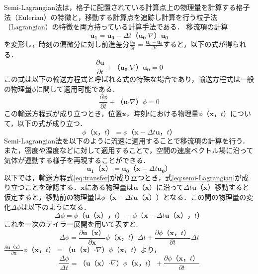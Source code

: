 \documentclass[a4j,12pt]{jreport}
\begin{document}
Semi-Lagrangian法は，格子に配置されている計算点上の物理量を計算する格子法（Eulerian）の特徴と，移動する計算点を追跡し計算を行う粒子法（Lagrangian）の特徴を両方持っている計算手法である．
移流項の計算$$\bm{u_1} = \bm{u_0}  - \varDelta t （\bm{u_0}  \boldsymbol{\cdot}\nabla） \bm{u_0}$$を変形し，時刻の偏微分に対し前進差分$\frac{\partial \bm{u}}{\partial t} = \frac{\bm{u_1} - \bm{u_0}}{ \varDelta t }$すると，以下の式が得られる．
\[
\frac{\partial \bm{u}}{\partial t}   +（\bm{u_0}  \boldsymbol{\cdot}\nabla） \bm{u_0} = 0
\]
この式は以下の輸送方程式と呼ばれる式の特殊な場合であり，輸送方程式は一般の物理量$\phi$に関して適用可能である．
\begin{equation}\label{eq:transfer}
	\frac{\partial {\phi}}{\partial t}  +（\bm{u}  \boldsymbol{\cdot}\nabla） {\phi} = 0
\end{equation} 
この輸送方程式が成り立つとき，位置$\bm{x}$，時刻$t$における物理量$\phi（\bm{x}，t）$について，以下の式が成り立つ．
\begin{equation}\label{eq:semi-Lagrangian}
	{\phi}（\bm{x}，t） = {\phi}（\bm{x}  - \varDelta t \bm{u}，t）
\end{equation} 
Semi-Lagrangian法を以下のように流速に適用することで移流項の計算を行う．また，密度や温度などに対して適用することで，空間の速度ベクトル場に沿って気体が運動する様子を再現することができる．
\begin{equation}\label{eq:advect}
	\bm{u_1}（\bm{x}） = \bm{u_0}（\bm{x}  - \varDelta t \bm{u_0}）
\end{equation}
以下では，輸送方程式\ref{eq:transfer}が成り立つとき，式\ref{eq:semi-Lagrangian}が成り立つことを確認する．$\bm{x}$にある物理量は$\bm{u} （\bm{x}） $に沿って$\varDelta t\bm{u} （\bm{x}）$移動すると仮定すると，移動前の物理量は$\phi（\bm{x} -  \varDelta t\bm{u} （\bm{x}））$となる．この間の物理量の変化$\varDelta {\phi}$は以下のようになる．
\[
\varDelta \phi = \phi（ \bm{u} （\bm{x}），t） - \phi （\bm{x} - \varDelta t\bm{u} （\bm{x}），t）
\]
これを一次のテイラー展開を用いて表すと,
\[
\varDelta \phi   = \frac{\partial \bm{u} （\bm{x}） }{\partial \bm{x}}\phi （\bm{x}，t） \varDelta t + \frac{\partial \phi （\bm{x}，t） }{\partial t}\varDelta t
\]
$\frac{\partial \bm{u} （\bm{x}） }{\partial \bm{x}}\phi （\bm{x}，t）= （\bm{u}（\bm{x}） \boldsymbol{\cdot}\nabla）\phi（\bm{x}，t）$より，
\[
 \frac{\varDelta \phi}{\varDelta t} =  （\bm{u}（\bm{x}）\boldsymbol{\cdot}\nabla） \phi（\bm{x}，t） + \frac{\partial \phi（\bm{x}，t） }{\partial t}
 \]
 
\end{document}

